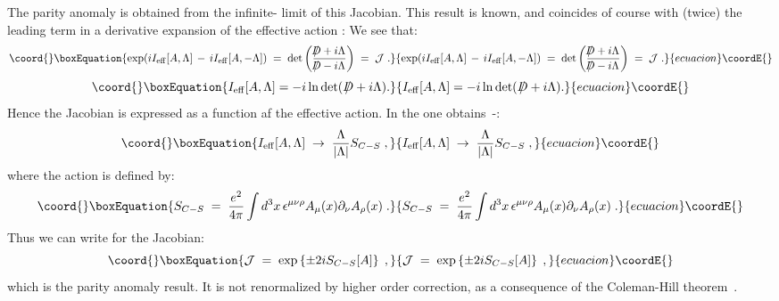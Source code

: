 \documentclass[a4paper,12pt]{article}
\providecommand{\Dcslash}{/\!\!\!\! D}
\begin{document}
The parity anomaly is obtained from the infinite-\myHighlight{$\Lambda$}\coordHE{} limit of
this Jacobian. This result is known, and coincides of course with
(twice) the leading term in a derivative expansion of the effective
action \coordHE{}: We see that:
\begin{equation}\coord{}\boxEquation{
\exp(iI_{\mathrm{eff}}[A,\Lambda]\,-\,iI_{\mathrm{eff}}[A,-\Lambda])
\;=\; \det\left( \frac{\Dcslash+i\Lambda}{\Dcslash-i\Lambda}\right) \;=\; \mathcal{J}\;.
}{
\exp(iI_{\mathrm{eff}}[A,\Lambda]\,-\,iI_{\mathrm{eff}}[A,-\Lambda])
\;=\; \det\left( \frac{\Dcslash+i\Lambda}{\Dcslash-i\Lambda}\right) \;=\; \mathcal{J}\;.
}{ecuacion}\coordE{}\end{equation}
\begin{equation}\coord{}\boxEquation{
I_{\mathrm{eff}}[A,\Lambda] = -i \ln \det(\,\Dcslash+i\Lambda).
}{
I_{\mathrm{eff}}[A,\Lambda] = -i \ln \det(\,\Dcslash+i\Lambda).
}{ecuacion}\coordE{}\end{equation}
Hence the Jacobian is expressed as a function af the effective action.
In the \myHighlight{$\Lambda\to\infty$}\coordHE{} one obtains~\cite{Dunne}-\cite{S}:
\begin{equation}\coord{}\boxEquation{
I_{\mathrm{eff}}[A,\Lambda]\;\to\; \frac{\Lambda}{|\Lambda|} S_{C-S}\;,
}{
I_{\mathrm{eff}}[A,\Lambda]\;\to\; \frac{\Lambda}{|\Lambda|} S_{C-S}\;,
}{ecuacion}\coordE{}\end{equation}
where the \coordHE{} action \coordHE{} is defined by:
\begin{equation}\coord{}\boxEquation{
  \label{eq:scs}
  S_{C-S}\;=\;\frac{e^2}{4\pi} \int d^3x\,\epsilon^{\mu\nu\rho}
  A_{\mu}(x) \partial_{\nu} A_{\rho}(x) \;.
}{
  S_{C-S}\;=\;\frac{e^2}{4\pi} \int d^3x\,\epsilon^{\mu\nu\rho}
  A_{\mu}(x) \partial_{\nu} A_{\rho}(x) \;.
}{ecuacion}\coordE{}\end{equation}
Thus we can write for the Jacobian:
\begin{equation}\coord{}\boxEquation{
\label{eq:jac}
\mathcal{J} \;=\; \exp\left\{ \pm 2 i S_{C-S}[A] \right\} \;, 
}{
\mathcal{J} \;=\; \exp\left\{ \pm 2 i S_{C-S}[A] \right\} \;, 
}{ecuacion}\coordE{}\end{equation}
which is the parity anomaly result. It is not renormalized by higher
order correction, as a consequence of the Coleman-Hill
theorem~\cite{Coleman-Hill}.
\end{document}
